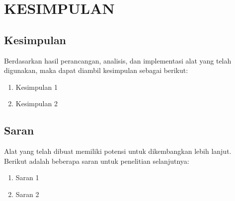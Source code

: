 \chapter{KESIMPULAN}
\section{Kesimpulan}
Berdasarkan hasil perancangan, analisis, dan implementasi alat yang telah digunakan, maka dapat diambil kesimpulan sebagai berikut:
\begin{enumerate}
   \item Kesimpulan 1
   \item Kesimpulan 2
\end{enumerate}

\vspace{1em}

\section{Saran}
Alat yang telah dibuat memiliki potensi untuk dikembangkan lebih lanjut. Berikut adalah beberapa saran untuk penelitian selanjutnya:
\begin{enumerate}
   \item Saran 1
   \item Saran 2
\end{enumerate}
